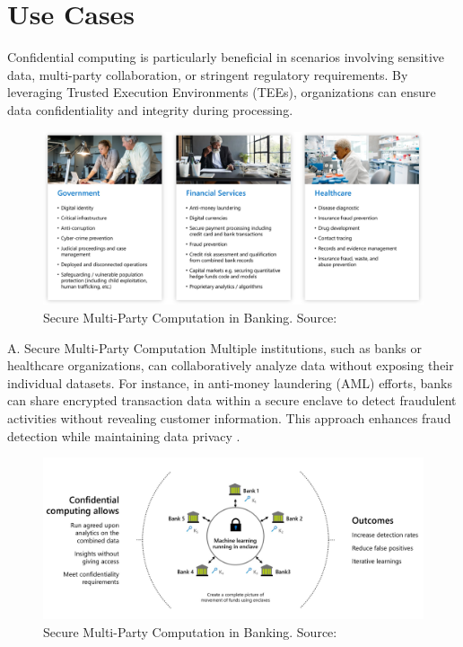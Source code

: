 \documentclass[conference]{IEEEtran}
\begin{document}
\section{Use Cases}
Confidential computing is particularly beneficial in scenarios involving sensitive data, 
multi-party collaboration, or stringent regulatory requirements. By leveraging Trusted Execution 
Environments (TEEs), organizations can ensure data confidentiality and integrity during processing.

\begin{figure}[H]
\centerline{\includegraphics[width=\linewidth]{figures/mpc-uses.png}}
\caption{Secure Multi-Party Computation in Banking. Source: \cite{azure_mpc}}
\label{fig:mpc_banking}
\end{figure}

A. Secure Multi-Party Computation
Multiple institutions, such as banks or healthcare organizations, can collaboratively analyze 
data without exposing their individual datasets. For instance, in anti-money laundering (AML) 
efforts, banks can share encrypted transaction data within a secure enclave to detect fraudulent 
activities without revealing customer information. This approach enhances fraud detection while 
maintaining data privacy \cite{azure_edge}.

\begin{figure}[H]
\centerline{\includegraphics[width=\linewidth]{figures/mpc-banking.png}}
\caption{Secure Multi-Party Computation in Banking. Source: \cite{azure_mpc}}
\label{fig:mpc_banking}
\end{figure}
\end{document}
